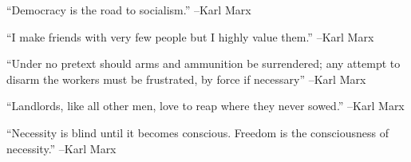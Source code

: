 \documentclass{article}%
\begin{document}
\vspace{1mm}%
\begin{minipage}{\textwidth}%
\flushleft%
“Democracy is the road to socialism.”%
\linebreak%
\vspace{1mm}%
–Karl Marx%
\linebreak%
\vspace{1mm}%
\end{minipage}%
\linebreak%
\vspace{1mm}%
\begin{minipage}{\textwidth}%
\flushleft%
“I make friends with very few people but I highly value them.”%
\linebreak%
\vspace{1mm}%
–Karl Marx%
\linebreak%
\vspace{1mm}%
\end{minipage}%
\linebreak%
\vspace{1mm}%
\begin{minipage}{\textwidth}%
\flushleft%
“Under no pretext should arms and ammunition be surrendered; any attempt to disarm the workers must be frustrated, by force if necessary”%
\linebreak%
\vspace{1mm}%
–Karl Marx%
\linebreak%
\vspace{1mm}%
\end{minipage}%
\linebreak%
\vspace{1mm}%
\begin{minipage}{\textwidth}%
\flushleft%
“Landlords, like all other men, love to reap where they never sowed.”%
\linebreak%
\vspace{1mm}%
–Karl Marx%
\linebreak%
\vspace{1mm}%
\end{minipage}%
\linebreak%
\vspace{1mm}%
\begin{minipage}{\textwidth}%
\flushleft%
“Necessity is blind until it becomes conscious. Freedom is the consciousness of necessity.”%
\linebreak%
\vspace{1mm}%
–Karl Marx%
\linebreak%
\vspace{1mm}%
\end{minipage}%
\end{document}
